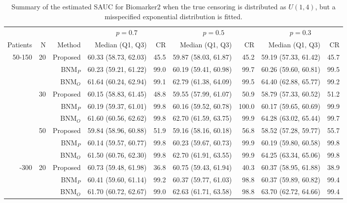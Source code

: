 \begin{table}[!htb]

\caption{\label{tab:sauc4}Summary of the estimated SAUC for Biomarker2 when the true censoring is distributed as $U(1,4)$, but a misspecified exponential distribution is fitted.}
\centering
\begin{threeparttable}
\begin{tabular}[t]{rrrrrrrrr}
\toprule
\multicolumn{1}{c}{} & \multicolumn{1}{c}{} & \multicolumn{1}{c}{} & \multicolumn{2}{c}{$p = 0.7$} & \multicolumn{2}{c}{$p = 0.5$} & \multicolumn{2}{c}{$p = 0.3$} \\
\cmidrule(l{3pt}r{3pt}){4-5} \cmidrule(l{3pt}r{3pt}){6-7} \cmidrule(l{3pt}r{3pt}){8-9}
Patients & N & Method & Median (Q1, Q3) & CR & Median (Q1, Q3) & CR & Median (Q1, Q3) & CR\\
\midrule
50-150 & 20 & Proposed & 60.33 (58.73, 62.03) & 45.5 & 59.87 (58.03, 61.87) & 45.2 & 59.19 (57.33, 61.42) & 45.7\\
 &  & BNM$_P$ & 60.23 (59.21, 61.22) & 99.0 & 60.19 (59.41, 60.98) & 99.7 & 60.26 (59.60, 60.81) & 99.5\\
 &  & BNM$_O$ & 61.64 (60.24, 62.94) & 99.1 & 62.79 (61.38, 64.09) & 99.5 & 64.40 (62.88, 65.77) & 99.2\\
\addlinespace
 & 30 & Proposed & 60.15 (58.83, 61.45) & 48.8 & 59.55 (57.99, 61.07) & 50.9 & 58.79 (57.33, 60.52) & 51.2\\
 &  & BNM$_P$ & 60.19 (59.37, 61.01) & 99.8 & 60.16 (59.52, 60.78) & 100.0 & 60.17 (59.65, 60.69) & 99.9\\
 &  & BNM$_O$ & 61.60 (60.56, 62.62) & 99.8 & 62.70 (61.59, 63.75) & 99.9 & 64.28 (63.02, 65.44) & 99.7\\
\addlinespace
 & 50 & Proposed & 59.84 (58.96, 60.88) & 51.9 & 59.16 (58.16, 60.18) & 56.8 & 58.52 (57.28, 59.77) & 55.7\\
 &  & BNM$_P$ & 60.14 (59.57, 60.77) & 99.8 & 60.23 (59.67, 60.73) & 99.9 & 60.19 (59.80, 60.58) & 99.8\\
 &  & BNM$_O$ & 61.50 (60.76, 62.30) & 99.8 & 62.70 (61.91, 63.55) & 99.9 & 64.25 (63.34, 65.06) & 99.8\\
\addlinespace
50-300 & 20 & Proposed & 60.73 (59.48, 61.98) & 36.8 & 60.75 (59.43, 61.94) & 40.3 & 60.37 (58.95, 61.88) & 38.9\\
 &  & BNM$_P$ & 60.41 (59.60, 61.14) & 99.2 & 60.37 (59.77, 61.03) & 98.8 & 60.37 (59.89, 60.82) & 99.4\\
 &  & BNM$_O$ & 61.70 (60.72, 62.67) & 99.0 & 62.63 (61.71, 63.58) & 98.8 & 63.70 (62.72, 64.66) & 99.4\\

\end{tabular}
\end{threeparttable}
\end{table}
